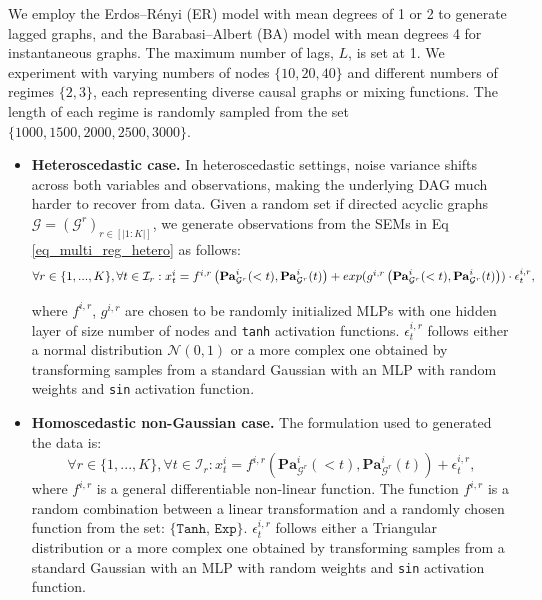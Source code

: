 We employ the Erdos–Rényi (ER) \citep{newman2018networks} model with mean degrees of 1 or 2 to generate lagged graphs, and the Barabasi–Albert (BA) \citep{barabasi1999emergence} model with mean degrees 4 for instantaneous graphs. The maximum number of lags, $L$, is set at 1. We experiment with varying numbers of nodes $\{10,20,40\}$ and different numbers of regimes $\{2,3\}$, each representing diverse causal graphs or mixing functions. The length of each regime is randomly sampled from the set $\{1000,1500,2000,2500, 3000\}$.
\begin{itemize}
    \item \textbf{Heteroscedastic case. }In heteroscedastic settings, noise variance shifts across both variables and observations, making the underlying DAG much harder to recover from data. Given a random set if directed acyclic graphs $\boldsymbol{\mathcal{G}} = (\mathcal{G}^r)_{r\in [|1:K|]}$, we generate observations from the SEMs in Eq \ref{eq_multi_reg_hetero} as follows:
    \begin{equation*}  
    \scalebox{0.9}{$
\forall r \in \{1,...,K\}, \forall t \in \mathcal{I}_r: x_t^i= f^{i,r}\left(\mathbf{P a}_{\mathcal{G}^r}^i(<t), \mathbf{P a}_{\mathcal{G}^r}^i(t)\right)+exp(g^{i,r}\left(\mathbf{P a}_{\mathcal{G}^r}^i(<t), \mathbf{P a}_{\mathcal{G}^r}^i(t)\right))\cdot\epsilon_t^{i,r},
$}
    \end{equation*}

where $f^{i,r}$, $g^{i,r}$ are chosen to be randomly initialized MLPs with one hidden layer of size number of nodes and \texttt{tanh} activation functions. $\epsilon_t^{i,r}$ follows either a normal distribution $\mathcal{N}(0,1)$ or a more complex one obtained by transforming samples from a standard Gaussian with an MLP with random weights and \texttt{sin} activation function.
\item \textbf{Homoscedastic non-Gaussian case. } The formulation used to generated the data is:$$
\forall r \in \{1,...,K\}, \forall t \in \mathcal{I}_r: x_t^i= f^{i,r}\left(\mathbf{P a}_{\mathcal{G}^r}^i(<t), \mathbf{P a}_{\mathcal{G}^r}^i(t)\right)+\epsilon_t^{i,r},
$$
where $f^{i,r}$ is a general differentiable non-linear function. The function $f^{i,r}$ is a random combination between a linear transformation and a randomly chosen function from the set: $\{\texttt{Tanh, Exp}\}$. $\epsilon_t^{i,r}$ follows either a Triangular distribution or a more complex one obtained by transforming samples from a standard Gaussian with an MLP with random weights and \texttt{sin} activation function.
\end{itemize}